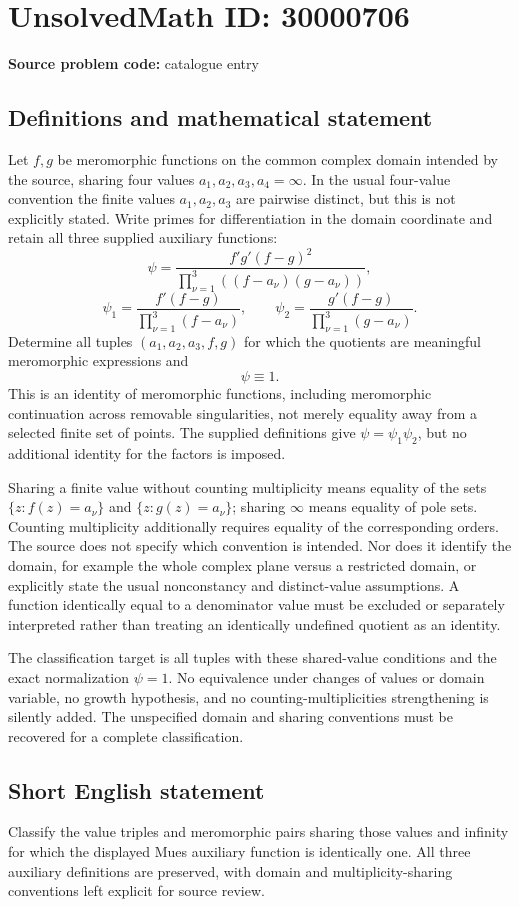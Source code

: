 \documentclass[11pt]{article}
\begin{document}
\section*{UnsolvedMath ID: 30000706}
\textbf{Source problem code:} catalogue entry
\subsection{Definitions and mathematical statement}
Let $f,g$ be meromorphic functions on the common complex domain intended by the source, sharing four values $a_1,a_2,a_3,a_4=\infty$. In the usual four-value convention the finite values $a_1,a_2,a_3$ are pairwise distinct, but this is not explicitly stated. Write primes for differentiation in the domain coordinate and retain all three supplied auxiliary functions:
\[
 \psi=\frac{f'g'(f-g)^2}
             {\prod_{\nu=1}^3((f-a_\nu)(g-a_\nu))},
\]
\[
 \psi_1=\frac{f'(f-g)}{\prod_{\nu=1}^3(f-a_\nu)},
 \qquad
 \psi_2=\frac{g'(f-g)}{\prod_{\nu=1}^3(g-a_\nu)}.
\]
Determine all tuples $(a_1,a_2,a_3,f,g)$ for which the quotients are meaningful meromorphic expressions and
\[
 \psi\equiv1.
\]
This is an identity of meromorphic functions, including meromorphic continuation across removable singularities, not merely equality away from a selected finite set of points. The supplied definitions give $\psi=\psi_1\psi_2$, but no additional identity for the factors is imposed.

Sharing a finite value without counting multiplicity means equality of the sets $\{z:f(z)=a_\nu\}$ and $\{z:g(z)=a_\nu\}$; sharing $\infty$ means equality of pole sets. Counting multiplicity additionally requires equality of the corresponding orders. The source does not specify which convention is intended. Nor does it identify the domain, for example the whole complex plane versus a restricted domain, or explicitly state the usual nonconstancy and distinct-value assumptions. A function identically equal to a denominator value must be excluded or separately interpreted rather than treating an identically undefined quotient as an identity.

The classification target is all tuples with these shared-value conditions and the exact normalization $\psi=1$. No equivalence under changes of values or domain variable, no growth hypothesis, and no counting-multiplicities strengthening is silently added. The unspecified domain and sharing conventions must be recovered for a complete classification.
\subsection{Short English statement}
Classify the value triples and meromorphic pairs sharing those values and infinity for which the displayed Mues auxiliary function is identically one. All three auxiliary definitions are preserved, with domain and multiplicity-sharing conventions left explicit for source review.
\end{document}
